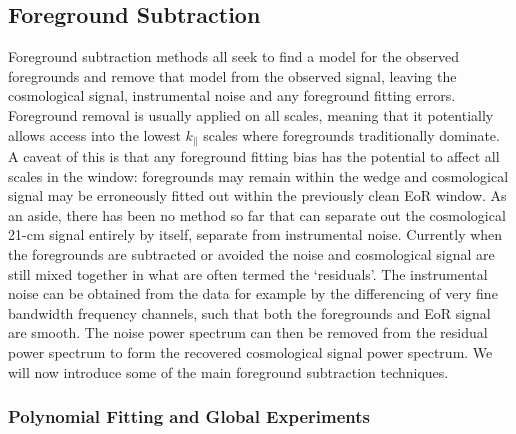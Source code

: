 \subsection{Foreground Subtraction}\label{sec:fgsub}
Foreground subtraction methods all seek to find a model for the observed foregrounds and remove that model from the observed signal, leaving the cosmological signal, instrumental noise and any foreground fitting errors. Foreground removal is usually applied on all scales, meaning that it potentially allows access into the lowest $k_\parallel$ scales where foregrounds traditionally dominate. A caveat of this is that any foreground fitting bias has the potential to affect all scales in the window: foregrounds may remain within the wedge and cosmological signal may be erroneously fitted out within the previously clean EoR window. As an aside, there has been no method so far that can separate out the cosmological 21-cm signal entirely by itself, separate from instrumental noise. Currently when the foregrounds are subtracted or avoided the noise and cosmological signal are still mixed together in what are often termed the `residuals'. The instrumental noise can be obtained from the data for example by the differencing of very fine bandwidth frequency channels, such that both the foregrounds and EoR signal are smooth. The noise power spectrum can then be removed from the residual power spectrum to form the recovered cosmological signal power spectrum. We will now introduce some of the main foreground subtraction techniques.

\subsubsection{Polynomial Fitting and Global Experiments}
\label{sec:poly}

